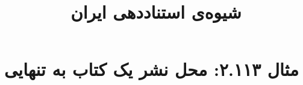 \documentclass[a4paper,10pt]{article}
\begin{document}
\title{شیوه‌ی استناددهی ایران
 }
\author{}
\date{}
\maketitle



\section*{مثال ۲.۱۱۳: محل نشر یک کتاب به تنهایی}

\cite{هدایت1315}\\
\cite{pittman1770}\\






\end{document}
